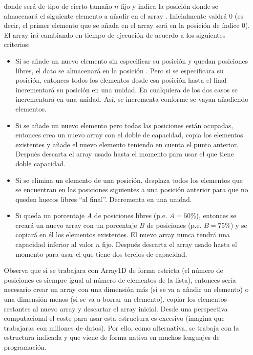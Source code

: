 \noindent donde  será de tipo  de cierto tamaño $n$ fijo y 
 indica la posición donde se almacenará el siguiente elemento a añadir en el array . Inicialmente  valdrá 0 (es decir, el primer elemento que se añada en el array será en la posición de índice 0). El  array irá cambiando en tiempo de ejecución de acuerdo a los siguientes criterios:
\begin{itemize}
\item Si se añade un nuevo elemento sin especificar su posición y quedan posiciones libres, el dato se almacenará en la posición . Pero si se especificara su posición, entonces todos los elementos desde esa posición hasta el final incrementará su posición en una unidad.
En cualquiera de los dos casos se incrementará  en una unidad. Así,  se incrementa conforme se vayan añadiendo elementos.
\item Si se añade un nuevo elemento pero todas las posiciones están ocupadas, entonces crea un nuevo array con el doble de capacidad, copia los elementos existentes y añade el nuevo elemento teniendo en cuenta el punto anterior. Después descarta el array usado hasta el momento para usar el que tiene doble capacidad.
\item Si se elimina un elemento de una posición, desplaza todos los elementos 
que se encuentran en las posiciones siguientes a una posición anterior para que 
no queden huecos libres ``al final''. Decrementa  en una unidad.
\item Si queda un porcentaje $A$ de posiciones libres (p.e. $A=50\%$), entonces
se creará un nuevo array con un porcentaje $B$ de posiciones (p.e. $B=75\%$) y se copiará en él los elementos existentes. El nuevo array nunca tendrá una capacidad inferior al valor $n$ fijo. Después descarta el array usado hasta el momento para usar el que tiene dos tercios de capacidad.
\end{itemize}

Observa que si se trabajara con Array1D de forma estricta (el número de posiciones es siempre igual al número de elementos de la lista), entonces sería necesario crear un array con una dimensión más (si se va a añadir un elemento) o una dimensión menos (si se va a borrar un elemento), copiar los elementos restantes al nuevo array y descartar el array inicial. Desde una perspectiva computacional el coste para usar esta estructura es excesivo (imagina que trabajaras con millones de datos). Por ello, como alternativa, se trabaja con la estructura indicada y que viene de forma nativa en muchos lenguajes de programación.

